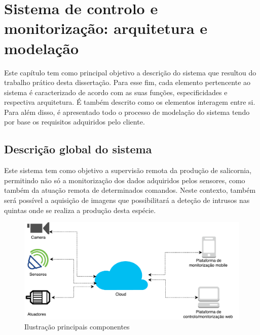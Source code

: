 

\chapter{Sistema de controlo e monitorização: arquitetura e modelação}


Este capítulo tem como principal objetivo a descrição do sistema que resultou do trabalho prático
desta dissertação. Para esse fim, cada elemento pertencente ao sistema é caracterizado de
acordo com as suas funções, especificidades e respectiva arquitetura. É também descrito como os elementos interagem entre si. Para além disso, é apresentado todo o processo de modelação do sistema tendo por base os requisitos adquiridos pelo cliente. 








\section{Descrição global do sistema}

Este sistema tem como objetivo a supervisão remota da produção de salicornia,  permitindo não só a monitorização dos dados adquiridos pelos sensores, como também da atuação remota de determinados comandos. Neste contexto, também será possível a aquisição de imagens que possibilitará a deteção de intrusos nas quintas onde se realiza a produção desta espécie.


\begin{figure}[!htb]
	\centering
	\includegraphics[scale=0.45]{esquemas/global_arquitetura.pdf}
	\caption{Ilustração principais componentes}
	\label{componentesall}
\end{figure}



